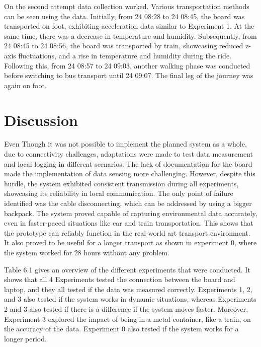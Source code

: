 On the second attempt data collection worked. Various transportation methods can be seen using the data. Initially, from 24 08:28 to 24 08:45, the board was transported on foot, exhibiting acceleration data similar to Experiment 1. At the same time, there was a decrease in temperature and humidity. Subsequently, from 24 08:45 to 24 08:56, the board was transported by train, showcasing reduced z-axis fluctuations, and a rise in temperature and humidity during the ride. Following this, from 24 08:57 to 24 09:03, another walking phase was conducted before switching to bus transport until 24 09:07. The final leg of the journey was again on foot.

\section{Discussion}
Even Though it was not possible to implement the planned system as a whole, due to connectivity challenges, adaptations were made to test data measurement and local logging in different scenarios.
The lack of documentation for the board made the implementation of data sensing more challenging. However, despite this hurdle, the system exhibited consistent transmission during all experiments, showcasing its reliability in local communication. The only point of failure identified was the cable disconnecting, which can be addressed by using a bigger backpack.
The system proved capable of capturing environmental data accurately, even in faster-paced situations like car and train transportation. This shows that the prototype can reliably function in the real-world art transport environment.
It also proved to be useful for a longer transport as shown in experiment 0, where the system worked for 28 hours without any problem.

Table 6.1 gives an overview of the different experiments that were conducted. It shows that all 4 Experiments tested the connection between the board and laptop, and they all tested if the data was measured correctly. Experiments 1, 2, and 3 also tested if the system works in dynamic situations, whereas Experiments 2 and 3 also tested if there is a difference if the system moves faster. Moreover, Experiment 3 explored the impact of being in a metal container, like a train, on the accuracy of the data. Experiment 0 also tested if the system works for a longer period.


